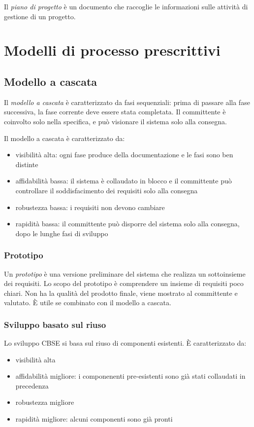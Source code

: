 \documentclass[11pt]{article}
\begin{document}
Il \textit{piano di progetto} è un documento che raccoglie le informazioni sulle attività di gestione di un progetto.
\section{Modelli di processo prescrittivi}
\subsection{Modello a cascata}
Il \textit{modello a cascata} è caratterizzato da fasi sequenziali: prima di passare alla fase successiva, la fase 
corrente deve essere stata completata. 
Il committente è coinvolto solo nella specifica, e può visionare il sistema solo alla consegna.

Il modello a cascata è caratterizzato da:
\begin{itemize}
    \item visibilità alta: ogni fase produce della documentazione e le fasi sono ben distinte
    \item affidabilità bassa: il sistema è collaudato in blocco e il committente può controllare il soddisfacimento dei 
    requisiti solo alla consegna 
    \item robustezza bassa: i requisiti non devono cambiare 
    \item rapidità bassa: il committente può disporre del sistema solo alla consegna, dopo le lunghe fasi di sviluppo
\end{itemize}
\subsubsection*{Prototipo}
Un \textit{prototipo} è una versione preliminare del sistema che realizza un sottoinsieme dei requisiti. Lo scopo del 
prototipo è comprendere un insieme di requisiti poco chiari. Non ha la qualità del prodotto finale, viene mostrato al 
committente e valutato. È utile se combinato con il modello a cascata.
\subsubsection*{Sviluppo basato sul riuso}
Lo sviluppo CBSE si basa sul riuso di componenti esistenti. È caratterizzato da:
\begin{itemize}
    \item visibilità alta
    \item affidabilità migliore: i componenenti pre-esistenti sono già stati collaudati in precedenza 
    \item robustezza migliore 
    \item rapidità migliore: alcuni componenti sono già pronti
\end{itemize}
\end{document}

